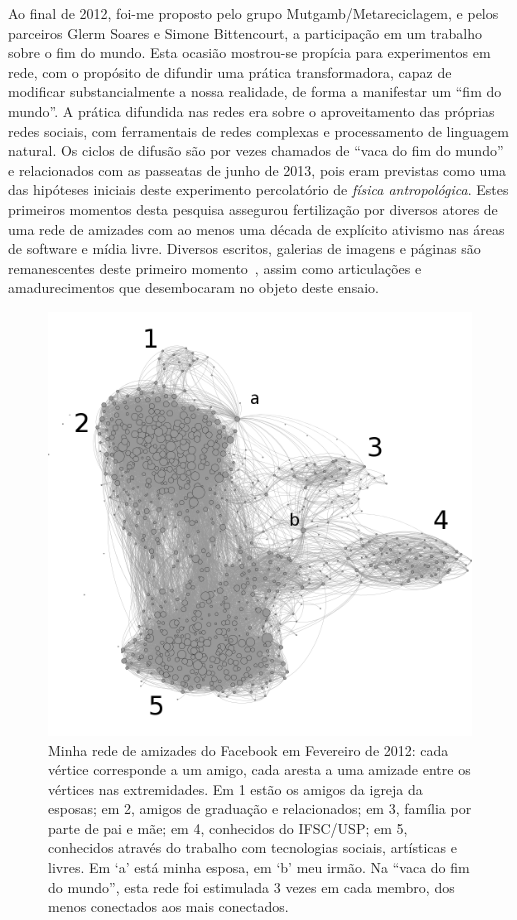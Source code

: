 \documentclass[a4paper, 11pt]{article} %
\begin{document}
Ao final de 2012, foi-me proposto pelo grupo Mutgamb/Metareciclagem, e pelos parceiros Glerm Soares e Simone Bittencourt, a participação  em um trabalho sobre o fim do mundo. Esta ocasião mostrou-se propícia para experimentos em rede, com o propósito de difundir uma prática transformadora, capaz de modificar substancialmente a nossa realidade, de forma a manifestar um ``fim do mundo''. A prática difundida nas redes era sobre o aproveitamento das próprias redes sociais, com ferramentais de redes complexas e processamento de linguagem natural. Os ciclos de difusão são por vezes chamados de ``vaca do fim do mundo'' e relacionados com as passeatas de junho de 2013, pois eram previstas como uma das hipóteses iniciais deste experimento percolatório de \emph{física antropológica}. Estes primeiros momentos desta pesquisa assegurou fertilização por diversos atores de uma rede de amizades com ao menos uma década de explícito ativismo nas áreas de software e mídia livre. Diversos escritos, galerias de imagens e páginas são remanescentes deste primeiro momento~\cite{ciberiun,ars,rc1,rc2}, assim como articulações e amadurecimentos que desembocaram no objeto deste ensaio.
\begin{figure}[h!]
  \centering
    \includegraphics[width=.9\textwidth]{rederf.png}
  \caption{\small Minha rede de amizades do Facebook em Fevereiro de 2012: cada vértice corresponde a um amigo, cada aresta a uma amizade entre os vértices nas extremidades. Em 1 estão os amigos da igreja da esposas; em 2, amigos de graduação e relacionados; em 3, família por parte de pai e mãe; em 4, conhecidos do IFSC/USP; em 5, conhecidos através do trabalho com tecnologias sociais, artísticas e livres. Em `a' está minha esposa, em `b' meu irmão. Na ``vaca do fim do mundo'', esta rede foi estimulada 3 vezes em cada membro, dos menos conectados aos mais conectados.}\label{fig:redem}
\end{figure}
\end{document}
